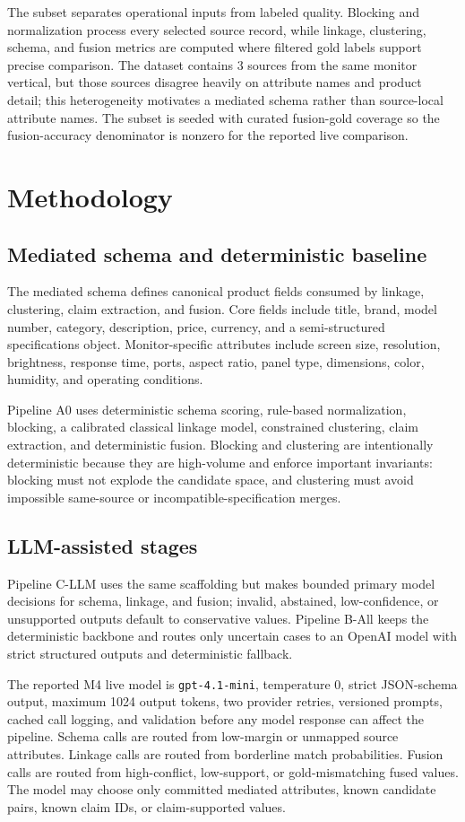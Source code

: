 \documentclass[10pt]{article}
\begin{document}
The subset separates operational inputs from labeled quality. Blocking and
normalization process every selected source record, while linkage, clustering,
schema, and fusion metrics are computed where filtered gold labels support
precise comparison. The dataset contains 3
sources from the same monitor vertical, but those sources disagree heavily on
attribute names and product detail; this heterogeneity motivates a mediated
schema rather than source-local attribute names. The subset is seeded with
curated fusion-gold coverage so the fusion-accuracy denominator is nonzero for
the reported live comparison.

\section{Methodology}
\subsection{Mediated schema and deterministic baseline}
The mediated schema defines canonical product fields consumed by linkage,
clustering, claim extraction, and fusion. Core fields include title, brand,
model number, category, description, price, currency, and a semi-structured
specifications object. Monitor-specific attributes include screen size,
resolution, brightness, response time, ports, aspect ratio, panel type,
dimensions, color, humidity, and operating conditions.

Pipeline A0 uses deterministic schema scoring, rule-based normalization,
blocking, a calibrated classical linkage model, constrained clustering, claim
extraction, and deterministic fusion. Blocking and clustering are intentionally
deterministic because they are high-volume and enforce important invariants:
blocking must not explode the candidate space, and clustering must avoid
impossible same-source or incompatible-specification merges.

\subsection{LLM-assisted stages}
Pipeline C-LLM uses the same scaffolding but makes bounded primary model
decisions for schema, linkage, and fusion; invalid, abstained, low-confidence,
or unsupported outputs default to conservative values. Pipeline B-All keeps the
deterministic backbone and routes only uncertain cases to an OpenAI model with
strict structured outputs and deterministic fallback.

The reported M4 live model is \texttt{gpt-4.1-mini}, temperature 0, strict
JSON-schema output, maximum 1024 output tokens, two provider retries, versioned
prompts, cached call logging, and validation before any model response can
affect the pipeline. Schema calls are routed from low-margin or unmapped source
attributes. Linkage calls are routed from borderline match probabilities.
Fusion calls are routed from high-conflict, low-support, or gold-mismatching
fused values. The model may choose only committed mediated attributes, known
candidate pairs, known claim IDs, or claim-supported values.
\end{document}

